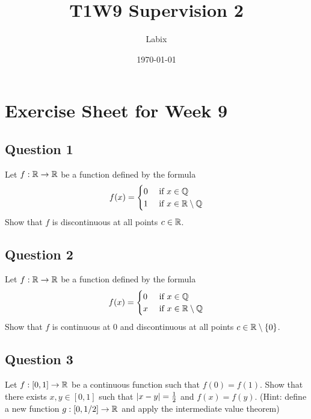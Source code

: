 \documentclass[a4paper]{article}
\title{T1W9 Supervision 2}
\author{Labix}
\date{\today}
\begin{document}
\section*{Exercise Sheet for Week 9}
\subsection*{Question 1}
Let $f:\mathbb{R}\to\mathbb{R}$ be a function defined by the formula $$f(x)=\begin{cases}
0 & \text{ if } x\in\mathbb{Q}\\
1 & \text{ if } x\in\mathbb{R}\setminus\mathbb{Q}
\end{cases}$$
Show that $f$ is discontinuous at all points $c\in\mathbb{R}$. 


\subsection*{Question 2}
Let $f:\mathbb{R}\to\mathbb{R}$ be a function defined by the formula $$f(x)=\begin{cases}
0 & \text{ if } x\in\mathbb{Q}\\
x & \text{ if } x\in\mathbb{R}\setminus\mathbb{Q}
\end{cases}$$
Show that $f$ is continuous at $0$ and discontinuous at all points $c\in\mathbb{R}\setminus\{0\}$. 

\subsection*{Question 3}
Let $f:[0,1]\to\mathbb{R}$ be a continuous function such that $f(0)=f(1)$. Show that there exists $x,y\in[0,1]$ such that $\abs{x-y}=\frac{1}{2}$ and $f(x)=f(y)$. (Hint: define a new function $g:[0,1/2]\to\mathbb{R}$ and apply the intermediate value theorem)
\end{document}

